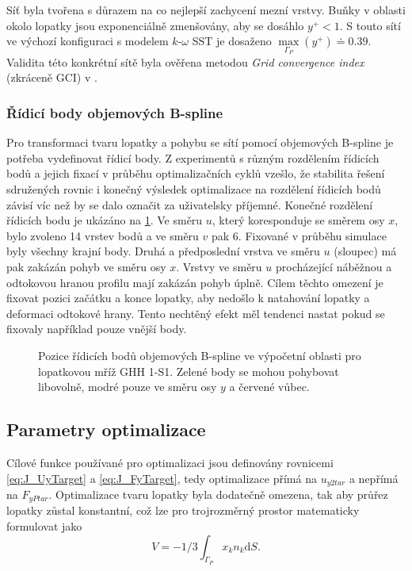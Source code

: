 Síť byla tvořena s důrazem na co nejlepší zachycení mezní vrstvy. Buňky v oblasti okolo lopatky jsou exponenciálně zmenšovány, aby se dosáhlo $ y^+ < 1 $.
S touto sítí ve výchozí konfiguraci s modelem $k\text{-}\omega$ SST je dosaženo $ \max\limits_{\Gamma_P}(y^+) \doteq 0.39 $. Validita této konkrétní sítě byla ověřena metodou \textit{Grid convergence index} (zkráceně GCI) v \cite{tater2021mesh}.


\subsubsection{Řídicí body objemových B-spline}
Pro transformaci tvaru lopatky a pohybu se sítí pomocí objemových B-spline je potřeba vydefinovat řídicí body. Z experimentů s různým rozdělením řídicích bodů a jejich fixací v průběhu optimalizačních cyklů vzešlo, že stabilita řešení sdružených rovnic i konečný výsledek optimalizace na rozdělení řídicích bodů závisí víc než by se dalo označit za uživatelsky příjemné. Konečné rozdělení řídicích bodu je ukázáno na \ref{fig:ghs1_cps}. Ve směru $ u $, který koresponduje se směrem osy $ x $, bylo zvoleno 14 vrstev bodů a ve směru $ v $ pak 6. Fixované v průběhu simulace byly všechny krajní body. Druhá a předposlední vrstva ve směru $ u $ (sloupec) má pak zakázán pohyb ve směru osy $ x $. Vrstvy ve směru $ u $ procházející náběžnou a odtokovou hranou profilu mají zakázán pohyb úplně. Cílem těchto omezení je fixovat pozici začátku a konce lopatky, aby nedošlo k natahování lopatky a deformaci odtokové hrany. Tento nechtěný efekt měl tendenci nastat pokud se fixovaly například pouze vnější body.
\begin{figure}
	\centering
	\def\svgwidth{1\textwidth}
	\graphicspath{{img/inkscape/}}
	
	\caption[Pozice řídicích bodů]{Pozice řídicích bodů objemových B-spline ve výpočetní oblasti pro lopatkovou mříž GHH 1-S1. Zelené body se mohou pohybovat libovolně, modré pouze ve směru osy $ y $ a červené vůbec.}
	\label{fig:ghs1_cps}
\end{figure}


\subsection{Parametry optimalizace}
Cílové funkce používané pro optimalizaci jsou definovány rovnicemi \ref{eq:J_UyTarget} a \ref{eq:J_FyTarget}, tedy optimalizace přímá na $ u_{y2tar} $ a nepřímá na $ F_{yPtar} $. Optimalizace tvaru lopatky byla dodatečně omezena, tak aby průřez lopatky zůstal konstantní, což lze pro trojrozměrný prostor matematicky formulovat jako \cite{adjoint2020foam}
\begin{equation} 
V=-1/3\int_{\Gamma_P}x_kn_k\mathrm{d}S.
\end{equation}

